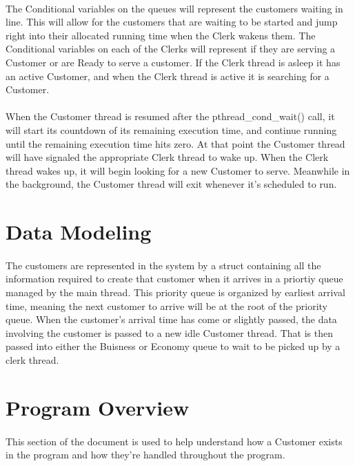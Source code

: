 \documentclass[12pt, letterpaper]{article}
\begin{document}
\paragraph{}
The Conditional variables on the queues will represent the customers waiting in line. This will allow for the customers that are waiting to be started and jump right into their allocated running time when the Clerk wakens them. The Conditional variables on each of the Clerks will represent if they are serving a Customer or are Ready to serve a customer. If the Clerk thread is asleep it has an active Customer, and when the Clerk thread is active it is searching for a Customer.

\paragraph{}
When the Customer thread is resumed after the pthread\_cond\_wait() call, it will start its countdown of its remaining execution time, and continue running until the remaining execution time hits zero. At that point the Customer thread will have signaled the appropriate Clerk thread to wake up. When the Clerk thread wakes up, it will begin looking for a new Customer to serve. Meanwhile in the background, the Customer thread will exit whenever it's scheduled to run.

\section{Data Modeling}
\paragraph{}
The customers are represented in the system by a struct containing all the information required to create that customer when it arrives in a priortiy queue managed by the main thread. This priority queue is organized by earliest arrival time, meaning the next customer to arrive will be at the root of the priority queue. When the customer's arrival time has come or slightly passed, the data involving the customer is passed to a new idle Customer thread. That is then passed into either the Buisness or Economy queue to wait to be picked up by a clerk thread. 

\section{Program Overview}
\paragraph{}
This section of the document is used to help understand how a Customer exists in the program and how they're handled throughout the program.
\end{document}
